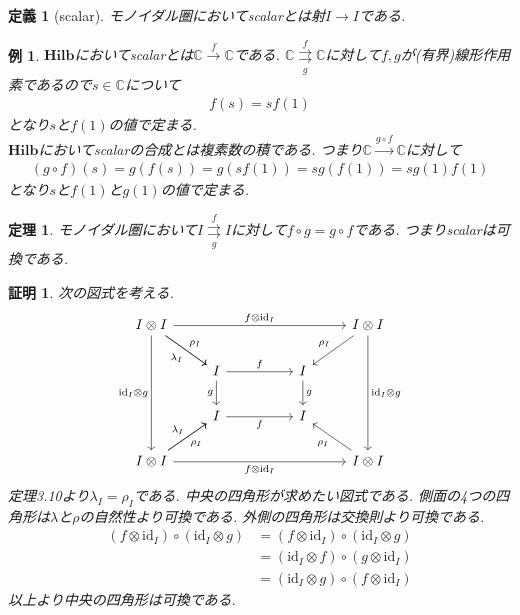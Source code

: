 \documentclass[a4paper,12pt]{ltjsarticle}
\theoremstyle{break}
\newtheorem{defn}[thm]{定義}
\newtheorem{thrm}[thm]{定理}
\newtheorem{eg}[thm]{例}
\newtheorem*{prf}{証明}
\newcommand{\hilb}{\mathbf{Hilb}}
\newcommand{\mbc}{\mathbb{C}}
\newcommand{\xr}[1]{\xrightarrow{#1}}
\newcommand{\id}{\mathrm{id}}
\newcommand{\ci}{\circ}
\newcommand{\la}{\lambda}
\newcommand{\ot}{\otimes}
\numberwithin{equation}{section}
\begin{document}
\begin{defn}[scalar]
  モノイダル圏においてscalarとは射$I \to I$である. 
\end{defn}

\begin{eg}
  $\hilb$においてscalarとは$\mbc \xr{f} \mbc$である. 
  $\mbc \overset{f}{\underset{g}{\rightrightarrows}} \mbc$に対して$f,g$が(有界)線形作用素であるので$s \in \mbc$について
  \begin{align*}
    f(s)=sf(1)
  \end{align*}
  となり$s$と$f(1)$の値で定まる. \\
  $\hilb$においてscalarの合成とは複素数の積である. 
  つまり$\mbc \xr{g \ci f} \mbc$に対して
  \begin{align*}
    (g \ci f)(s) = g(f(s)) = g(sf(1)) = sg(f(1)) = sg(1)f(1)
  \end{align*}
  となり$s$と$f(1)$と$g(1)$の値で定まる. 
\end{eg}

\begin{thrm}
  モノイダル圏において$I \overset{f}{\underset{g}{\rightrightarrows}} I$に対して$f \ci g = g \ci f$である. 
  つまりscalarは可換である. 
\end{thrm} 

\begin{prf}
  次の図式を考える. 
  \[\begin{tikzcd}
    {I \ot I} &&&& {I \ot I} \\
    & I && I \\
    & I && I \\
    {I \ot I} &&&& {I \ot I}
    \arrow["f", from=2-2, to=2-4]
    \arrow["g"', from=2-2, to=3-2]
    \arrow["f"', from=3-2, to=3-4]
    \arrow["g", from=2-4, to=3-4]
    \arrow["{\la_I}"', from=1-1, to=2-2]
    \arrow["{\id_I \ot g}"', from=1-1, to=4-1]
    \arrow["{f \ot \id_I}"', from=4-1, to=4-5]
    \arrow["{\id_I \ot g}", from=1-5, to=4-5]
    \arrow["{\rho_I}"', from=1-5, to=2-4]
    \arrow["{f \ot \id_I}", from=1-1, to=1-5]
    \arrow["{\la_I}", from=4-1, to=3-2]
    \arrow["{\rho_I}"', from=4-1, to=3-2]
    \arrow["{\rho_I}", from=4-5, to=3-4]
    \arrow["{\rho_I}", from=1-1, to=2-2]
  \end{tikzcd}\]
  定理3.10より$\la_I=\rho_I$である. 
  中央の四角形が求めたい図式である. 
  側面の4つの四角形は$\la$と$\rho$の自然性より可換である. 
  外側の四角形は交換則より可換である. 
  \begin{align*}
    (f \ot \id_I) \ci (\id_I \ot g)
    &= (f \ot \id_I) \ci (\id_I \ot g) \\
    &= (\id_I \ot f) \ci (g \ot \id_I) \\
    &= (\id_I \ot g) \ci (f \ot \id_I)
  \end{align*}
  以上より中央の四角形は可換である. 
\end{prf}
\end{document}
